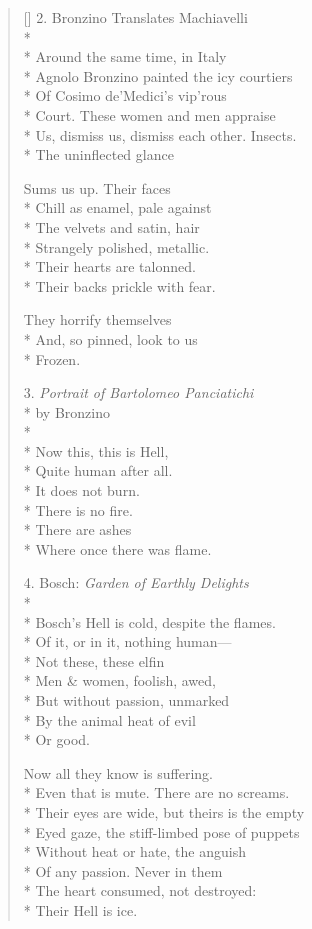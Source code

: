 \begin{verse}[\versewidth]
2. Bronzino Translates Machiavelli\\*
~\\*
Around the same time, in Italy\\*
Agnolo Bronzino painted the icy courtiers\\*
Of Cosimo de'Medici's vip'rous\\*
Court.  These women and men appraise\\*
Us, dismiss us, dismiss each other.  Insects.\\*
The uninflected glance

Sums us up.   Their faces\\*
Chill as enamel, pale against\\*
The velvets and satin, hair\\*
Strangely polished, metallic.\\*
Their hearts are talonned.\\*
Their backs prickle with fear.

They horrify themselves\\*
And, so pinned, look to us\\*
Frozen.

3. \textit{Portrait of Bartolomeo Panciatichi}\\*
\hspace{2\vgap} by Bronzino\\*
~\\*
Now this, this is Hell,\\*
Quite human after all.\\*
It does not burn.\\*
There is no fire.\\*
There are ashes\\*
Where once there was flame.

4. Bosch: \textit{Garden of Earthly Delights}\\*
~\\*
Bosch's Hell is cold, despite the flames.\\*
Of it, or in it, nothing human---\\*
Not these, these elfin\\*
Men \& women, foolish, awed,\\*
But without passion, unmarked\\*
By the animal heat of evil\\*
Or good.

Now all they know is suffering.\\*
Even that is mute. There are no screams.\\*
Their eyes are wide, but theirs is the empty\\*
Eyed gaze, the stiff-limbed pose of puppets\\*
Without heat or hate, the anguish\\*
Of any passion. Never in them\\*
The heart consumed, not destroyed:\\*
Their Hell is ice.


\end{verse}
